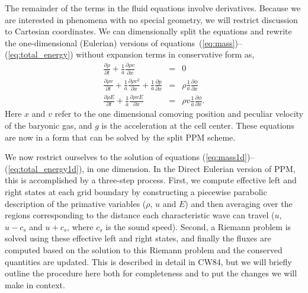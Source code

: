 The remainder of the terms in the fluid equations
involve derivatives.  
Because we are interested in phenomena with no special geometry, we will
restrict discussion to Cartesian coordinates.
We can dimensionally split the equations and rewrite the one-dimensional (Eulerian) 
versions of equations~(\ref{eq:mass})--(\ref{eq:total_energy}) without expansion terms
in conservative form as,
\begin{eqnarray}
\frac{\partial \rho}{\partial t}  + \frac{1}{a} \frac{\partial \rho v }{\partial x}    & = &  
     0 \label{eq:mass1d} \\
\frac{\partial \rho v}{\partial t}  + \frac{1}{a} \frac{\partial \rho v^2}{\partial x}   + 
      \frac{1}{a} \frac{\partial p}{ \partial x} & = & 
      \rho \frac{1}{a} \frac{\partial \phi}{ \partial x}  \label{eq:momentum1d}  \\
\frac{\partial \rho E}{\partial t}  + \frac{1}{a} \frac{\partial \rho v E}{\partial x}  & =  &
      \rho v \frac{1}{a} \frac{\partial \phi}{\partial x}. \label{eq:total_energy1d}
\end{eqnarray}
%
Here $x$ and $v$ refer to the one dimensional comoving position and 
peculiar velocity of the baryonic gas, and $g$ is the acceleration at the cell center.
These equations are now in a form that can be solved by the split PPM scheme.



We now restrict ourselves to the solution of equations
(\ref{eq:mass1d})--(\ref{eq:total_energy1d}), in one
dimension.  In the Direct Eulerian version of PPM, this is
accomplished by a three-step process.  First, we compute effective
left and right states at each grid boundary by constructing a
piecewise parabolic description of the primative variables ($\rho$, $u$
and $E$) and then averaging over the regions corresponding to the
distance each characteristic wave can travel ($u$, $u-c_s$ and
$u+c_s$, where $c_s$ is the sound speed).
Second, a Riemann problem is solved using these effective left and
right states, and finally the fluxes are computed based on the
solution to this Riemann problem and the conserved quantities are
updated.  This is described in detail in
CW84, but we will briefly outline the procedure
here both for completeness and to put the changes we will make in
context.


